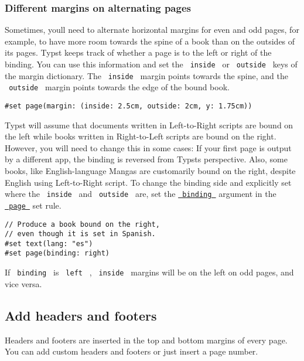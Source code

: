 \subsubsection{Different margins on alternating
pages}\label{alternating-margins}

Sometimes, you\textquotesingle ll need to alternate horizontal margins
for even and odd pages, for example, to have more room towards the spine
of a book than on the outsides of its pages. Typst keeps track of
whether a page is to the left or right of the binding. You can use this
information and set the \texttt{\ inside\ } or \texttt{\ outside\ } keys
of the margin dictionary. The \texttt{\ inside\ } margin points towards
the spine, and the \texttt{\ outside\ } margin points towards the edge
of the bound book.

\begin{verbatim}
#set page(margin: (inside: 2.5cm, outside: 2cm, y: 1.75cm))
\end{verbatim}

Typst will assume that documents written in Left-to-Right scripts are
bound on the left while books written in Right-to-Left scripts are bound
on the right. However, you will need to change this in some cases: If
your first page is output by a different app, the binding is reversed
from Typst\textquotesingle s perspective. Also, some books, like
English-language Mangas are customarily bound on the right, despite
English using Left-to-Right script. To change the binding side and
explicitly set where the \texttt{\ inside\ } and \texttt{\ outside\ }
are, set the
\href{/docs/reference/layout/page/\#parameters-binding}{\texttt{\ binding\ }}
argument in the \href{/docs/reference/layout/page/}{\texttt{\ page\ }}
set rule.

\begin{verbatim}
// Produce a book bound on the right,
// even though it is set in Spanish.
#set text(lang: "es")
#set page(binding: right)
\end{verbatim}

If \texttt{\ binding\ } is \texttt{\ left\ } , \texttt{\ inside\ }
margins will be on the left on odd pages, and vice versa.

\subsection{Add headers and footers}\label{headers-and-footers}

Headers and footers are inserted in the top and bottom margins of every
page. You can add custom headers and footers or just insert a page
number.

